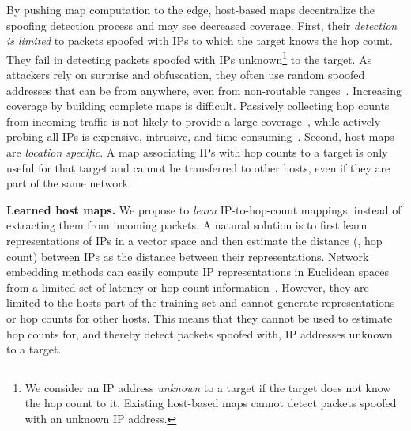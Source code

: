 By pushing map computation to the edge, host-based maps decentralize the spoofing detection process and may see decreased coverage. 
First, their {\em detection is limited} to packets spoofed with IPs to which the target knows the hop count. They fail in detecting packets spoofed with IPs unknown\footnote{We consider an IP address {\em unknown} to a target if the target does not know the hop count to it. Existing host-based maps cannot detect packets spoofed with an unknown IP address.} to the target. As attackers rely on surprise and obfuscation, they often use random spoofed addresses that can be from anywhere, even from non-routable
ranges~\citep{cloudflare}. Increasing coverage by building complete maps is difficult. Passively collecting hop counts from incoming traffic is not likely to provide a large coverage~\citep{hcf}, while actively probing all IPs is expensive, intrusive, and time-consuming~\citep{ark}. 
%
Second, host maps are {\em location specific}. A map associating IPs with hop counts to a target is only useful for that target and cannot be transferred to other hosts, even if they are part of the same network.
%


\textbf{Learned host maps.}
We propose to {\em learn} IP-to-hop-count mappings, instead of extracting them from incoming packets. 
A natural solution is to first learn representations of IPs in a vector space and then estimate the distance (\ie{}, hop count) between IPs as the distance between their representations. Network embedding methods can easily compute IP representations in Euclidean spaces from a limited set of latency or hop count information~\citep{vivaldi,gnp,pic,pyxida,barford-infocom}. 
%
However, they are limited to the hosts part of the training set and cannot generate representations or hop counts for other hosts. This means that they cannot be used to estimate hop counts for, and thereby detect packets spoofed with, IP addresses unknown to a target.

